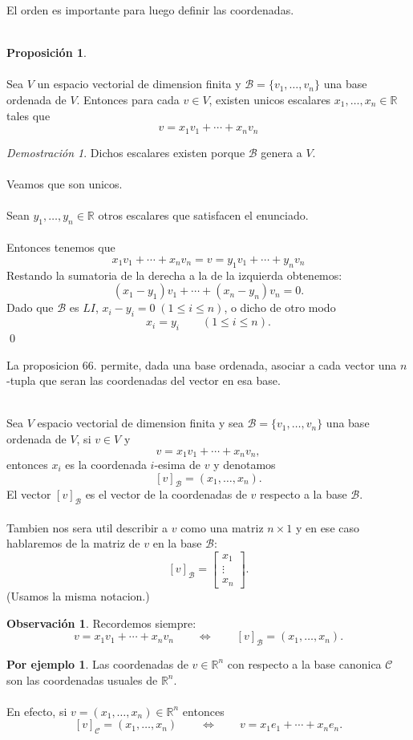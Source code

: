\documentclass{article}
\theoremstyle{definition}
\theoremstyle{definition}
\newtheorem*{obs}{Observación}
\newtheorem{prop}[teo]{Proposición}
\newtheorem*{ej}{Por ejemplo}
\theoremstyle{remark}
\newtheorem*{demo}{Demostración}
\begin{document}
El orden es importante para luego definir las coordenadas. \\\\ \begin{prop} \; \\\\
  Sea $V$ un espacio vectorial de dimension finita y $\mathcal{B}=\{v_1, \dots ,v_n\}$ una base ordenada de $V$. Entonces para cada $v \in V$, existen unicos escalares $x_1, \dots,x_n \in \mathbb{R}$ tales que \[v=x_1v_1+\cdots + x_nv_n\]
\end{prop} \begin{demo}
Dichos escalares existen porque $\mathcal{B}$ genera a $V$. \\\\ Veamos que son unicos. \\\\ Sean $y_1, \dots ,y_n \in \mathbb{R}$ otros escalares que satisfacen el enunciado. \\\\ Entonces tenemos que $$x_1v_1+\cdots + x_nv_n=v=y_1v_1+\cdots +y_nv_n$$ 
Restando la sumatoria de la derecha a la de la izquierda obtenemos: \[
  (x_1-y_1)v_1+\cdots + (x_n-y_n)v_n=0. 
\]
Dado que $\mathcal{B}$ es $LI$, $x_i-y_i=0 \; (1\leq i \leq n)$, o dicho de otro modo \[
x_i=y_i \quad \quad (1 \leq i \leq n).
\]
\qed
\end{demo}
La proposicion 66. permite, dada una base ordenada, asociar a cada vector una $n$-tupla que seran las coordenadas del vector en esa base.
\begin{defi}\; \\
  Sea $V$ espacio vectorial de dimension finita y sea $\mathcal{B}=\{v_1, \dots ,v_n\}$ una base ordenada de $V$, si $v \in V$ y \[
v=x_1v_1+\cdots + x_nv_n,
  \]
  entonces $x_i$ es la coordenada $i$-esima de $v$ y denotamos \[
    [v]_\mathcal{B}=(x_1,\dots ,x_n).
  \]
  El vector $[v]_\mathcal{B}$ es el vector de la coordenadas de $v$ respecto a la base $\mathcal{B}$.\\\\ Tambien nos sera util describir a $v$ como una matriz $ n \times 1$ y en ese caso hablaremos de la matriz de $v$ en la base $\mathcal{B}$: \[
    [v]_\mathcal{B}=\begin{bmatrix}x_1 \\ \vdots \\ x_n \end{bmatrix}.
  \]
  (Usamos la misma notacion.)
\end{defi}
\begin{obs}
  Recordemos siempre: \[
    v=x_1v_1+\cdots + x_nv_n \quad \quad \Longleftrightarrow \quad \quad [v]_\mathcal{B}=(x_1,\dots ,x_n).
  \]
\end{obs}
\begin{ej}
  Las coordenadas de $v \in \mathbb{R}^n$ con respecto a la base canonica $\mathcal{C}$ son las coordenadas usuales de $\mathbb{R}^n$. \\\\ En efecto, si $v = (x_1, \dots ,x_n) \in \mathbb{R}^n$ entonces \[
    [v]_\mathcal{C}=(x_1, \dots ,x_n) \quad \quad \Longleftrightarrow \quad \quad v=x_1 e_1+ \cdots + x_ne_n.
  \]
\end{ej} \pagebreak 
\end{document}
